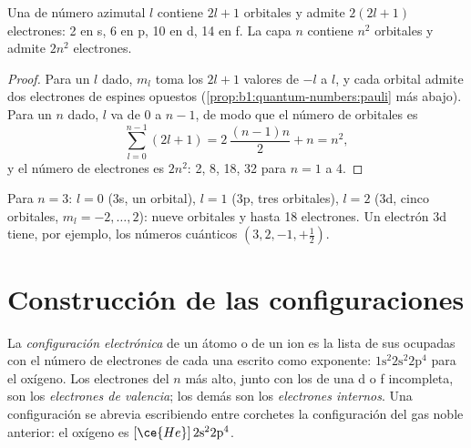 \begin{proposition}\label{prop:b1:quantum-numbers:capacity}
Una  de número azimutal $l$ contiene $2l + 1$ orbitales y admite
$2(2l + 1)$ electrones: 2 en s, 6 en p, 10 en d, 14 en f. La capa $n$
contiene $n^2$ orbitales y admite $2n^2$ electrones.
\end{proposition}

\begin{proof}
Para un $l$ dado, $m_l$ toma los $2l + 1$ valores de $-l$ a $l$, y cada
orbital admite dos electrones de espines opuestos (\cref{prop:b1:quantum-numbers:pauli}
más abajo). Para un $n$ dado, $l$ va de $0$ a $n - 1$, de modo que el
número de orbitales es
\[
  \sum_{l=0}^{n-1} (2l+1) = 2\,\frac{(n-1)n}{2} + n = n^2 ,
\]
y el número de electrones es $2n^2$: 2, 8, 18, 32 para $n = 1$ a 4.
\end{proof}

\begin{example}\label{ex:b1:quantum-numbers:third}
Para $n = 3$: $l = 0$ (3s, un orbital), $l = 1$ (3p, tres orbitales),
$l = 2$ (3d, cinco orbitales, $m_l = -2, \dots, 2$): nueve orbitales y
hasta 18 electrones. Un electrón 3d tiene, por ejemplo, los números
cuánticos $(3, 2, -1, +\tfrac12)$.
\end{example}

\section{Construcción de las configuraciones}

\begin{definition}\label{def:b1:quantum-numbers:configuration}
La \emph{configuración electrónica} de un
átomo o de un ion es la lista de sus  ocupadas con el número de
electrones de cada una escrito como exponente: $1\text{s}^2 2\text{s}^2
2\text{p}^4$ para el oxígeno. Los electrones del $n$ más alto, junto con
los de una  d o f incompleta, son los \emph{electrones de
valencia}; los demás son los \emph{electrones
internos}. Una configuración se abrevia
escribiendo entre corchetes la configuración del gas noble anterior:
el oxígeno es $[\ce{He}]\,2\text{s}^2 2\text{p}^4$.
\end{definition}

